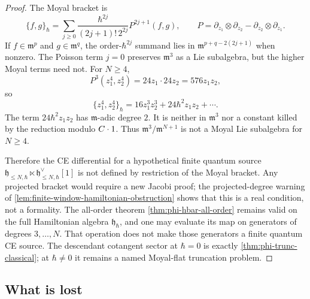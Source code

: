 \begin{proof}
  The Moyal bracket is
  $$\{f,g\}_\hbar=\sum_{j\geq 0}
    \frac{\hbar^{2j}}{(2j+1)!\,2^{2j}}P^{2j+1}(f,g),\qquad
    P=\partial_{z_1}\otimes\partial_{z_2}
      -\partial_{z_2}\otimes\partial_{z_1}.$$
  If $f\in\mathfrak m^p$ and $g\in\mathfrak m^q$, the
  order-$\hbar^{2j}$ summand lies in
  $\mathfrak m^{p+q-2(2j+1)}$ when nonzero.  The Poisson term
  $j=0$ preserves $\mathfrak m^3$ as a Lie subalgebra, but the
  higher Moyal terms need not.  For $N\geq4$,
  $$P^3(z_1^4,z_2^4)=24z_1\cdot24z_2=576z_1z_2,$$
  so
  $$\{z_1^4,z_2^4\}_\hbar
    =16z_1^3z_2^3+24\hbar^2 z_1z_2+\cdots.$$
  The term $24\hbar^2z_1z_2$ has $\mathfrak m$-adic degree $2$.
  It is neither in $\mathfrak m^3$ nor a constant killed by the
  reduction modulo $C\cdot1$.  Thus
  $\mathfrak m^3/\mathfrak m^{N+1}$ is not a Moyal Lie subalgebra
  for $N\geq4$.

  Therefore the CE differential for a hypothetical finite quantum
  source
  $\mathfrak h_{\leq N,\hbar}\ltimes
  \mathfrak h_{\leq N,\hbar}^\vee[1]$ is not defined by restriction
  of the Moyal bracket.  Any projected bracket would require a new
  Jacobi proof; the projected-degree warning of
  \ref{lem:finite-window-hamiltonian-obstruction} shows that this is
  a real condition, not a formality.  The all-order theorem
  \ref{thm:phi-hbar-all-order} remains valid on the full
  Hamiltonian algebra $\mathfrak h_\hbar$, and one may evaluate its
  map on generators of degrees $3,\ldots,N$.  That operation does not
  make those generators a finite quantum CE source.  The descendant
  cotangent sector at $\hbar=0$ is exactly
  \ref{thm:phi-trunc-classical}; at $\hbar\neq0$ it remains a named
  Moyal-flat truncation problem.
\end{proof}

\subsection*{What is lost}


